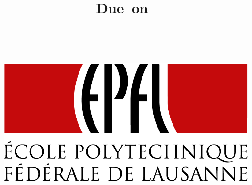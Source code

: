 \documentclass{article}
\title{
\vspace{2in}
\textmd{\textbf{\hmwkClass}}\\
\textmd{\textbf{\hmwkTitle}}\\
\normalsize\vspace{0.1in}\small{Due\ on\ \hmwkDueDate}\\
\vspace{0.1in}
\vspace{2.5in}
}
\author{\textbf{\hmwkGroup} \\ \textbf{\hmwkAuthorName}}
\date{} %
\begin{document}
\maketitle
\begin{center}
\includegraphics[width=0.4\columnwidth]{EPFL} %
\end{center}



\newpage


\end{document}
